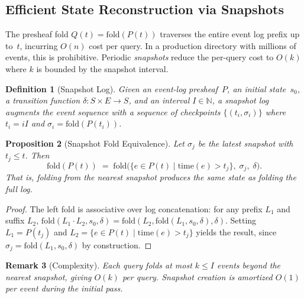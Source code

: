 \documentclass[11pt,a4paper]{article}
\newtheorem{definition}{Definition}[section]
\newtheorem{proposition}[definition]{Proposition}
\newtheorem{remark}[definition]{Remark}
\begin{document}
\subsection{Efficient State Reconstruction via Snapshots}
\label{sec:snapshots}

The presheaf fold $Q(t) = \mathrm{fold}(P(t))$ traverses the entire event
log prefix up to~$t$, incurring $O(n)$ cost per query. In a production
directory with millions of events, this is prohibitive. Periodic
\emph{snapshots} reduce the per-query cost to $O(k)$ where $k$ is bounded
by the snapshot interval.

\begin{definition}[Snapshot Log]
\label{def:snapshot-log}
Given an event-log presheaf~$P$, an initial state~$s_0$, a transition
function $\delta: S \times E \to S$, and an interval $I \in \mathbb{N}$, a
\emph{snapshot log} augments the event sequence with a sequence of
checkpoints $\{(t_i, \sigma_i)\}$ where $t_i = iI$ and
$\sigma_i = \mathrm{fold}(P(t_i))$.
\end{definition}

\begin{proposition}[Snapshot Fold Equivalence]
\label{prop:snapshot-equiv}
Let $\sigma_j$ be the latest snapshot with $t_j \le t$. Then
\[
  \mathrm{fold}(P(t)) \;=\;
  \mathrm{fold}\!\bigl(\{e \in P(t) \mid \mathrm{time}(e) > t_j\},\;
  \sigma_j,\; \delta\bigr).
\]
That is, folding from the nearest snapshot produces the same state as
folding the full log.
\end{proposition}

\begin{proof}
The left fold is associative over log concatenation: for any prefix
$L_1$ and suffix $L_2$,
$\mathrm{fold}(L_1 \cdot L_2, s_0, \delta) =
\mathrm{fold}(L_2, \mathrm{fold}(L_1, s_0, \delta), \delta)$.
Setting $L_1 = P(t_j)$ and $L_2 = \{e \in P(t) \mid \mathrm{time}(e) > t_j\}$
yields the result, since $\sigma_j = \mathrm{fold}(L_1, s_0, \delta)$ by
construction.
\end{proof}

\begin{remark}[Complexity]
\label{rem:snapshot-complexity}
Each query folds at most $k \le I$ events beyond the nearest snapshot,
giving $O(k)$ per query. Snapshot creation is amortized $O(1)$ per event
during the initial pass.
\end{remark}
\end{document}

